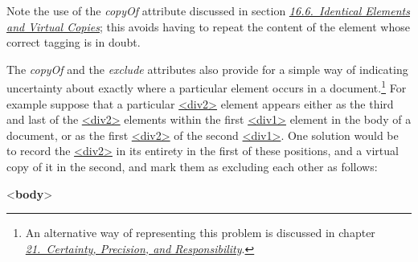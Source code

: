 Note the use of the {\itshape copyOf} attribute discussed in section \textit{\hyperref[SAIE]{16.6.\ Identical Elements and Virtual Copies}}; this avoids having to repeat the content of the element whose correct tagging is in doubt.\par
The {\itshape copyOf} and the {\itshape exclude} attributes also provide for a simple way of indicating uncertainty about exactly where a particular element occurs in a document.\footnote{An alternative way of representing this problem is discussed in chapter \textit{\hyperref[CE]{21.\ Certainty, Precision, and Responsibility}}.} For example suppose that a particular \hyperref[TEI.div2]{<div2>} element appears either as the third and last of the \hyperref[TEI.div2]{<div2>} elements within the first \hyperref[TEI.div1]{<div1>} element in the body of a document, or as the first \hyperref[TEI.div2]{<div2>} of the second \hyperref[TEI.div1]{<div1>}. One solution would be to record the \hyperref[TEI.div2]{<div2>} in its entirety in the first of these positions, and a virtual copy of it in the second, and mark them as excluding each other as follows: \par\bgroup{}\exampleFont \begin{shaded}\noindent\mbox{}{<\textbf{body}>}\mbox{}\newline 
{}\mbox{}\newline 
\hspace*{1em}\mbox{}\newline 
{}\mbox{}\newline 
{}\mbox{}\newline 
\hspace*{1em}
\end{shaded}
